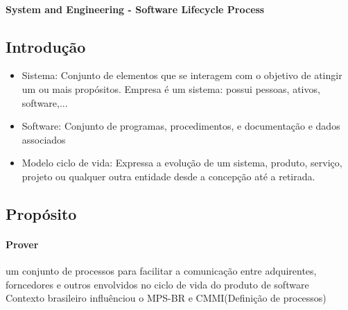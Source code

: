 \documentclass{article}
\begin{document}
\paragraph{\textbf{System} and \textbf{Engineering} - Software \textbf{Lifecycle} Process}
\subsection{Introdução}
	\begin{itemize}
	\item Sistema: Conjunto de elementos que se interagem com o objetivo de atingir um ou mais propósitos. Empresa é um sistema: possui pessoas, ativos, software,...
	\item Software: Conjunto de programas, procedimentos, e documentação e dados associados
	\item Modelo ciclo de vida: Expressa a evolução de um sistema, produto, serviço, projeto ou qualquer outra entidade desde a concepção até a retirada.
	\end{itemize}

\subsection{Propósito}
	\paragraph{Prover} um conjunto de processos para facilitar a comunicação entre adquirentes, forncedores e outros envolvidos no ciclo de vida do produto de software\\

	Contexto brasileiro influênciou o MPS-BR e CMMI(Definição de processos)
	
\end{document}

